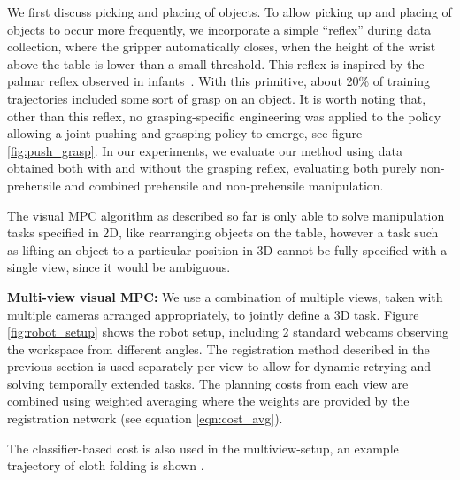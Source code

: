 We first discuss picking and placing of objects. To allow picking up and placing of objects to occur more frequently, we incorporate a simple ``reflex'' during data collection, where the gripper automatically closes, when the height of the wrist above the table is lower than a small threshold. This reflex is inspired by the palmar reflex observed in infants~\cite{grasping_fetal}. With this primitive, about 20\% of training trajectories included some sort of grasp on an object. It is worth noting that, other than this reflex, no grasping-specific engineering was applied to the policy allowing a joint pushing and grasping policy to emerge, see figure \ref{fig:push_grasp}. In our experiments, we evaluate our method using data obtained both with and without the grasping reflex, evaluating both purely non-prehensile and combined prehensile and non-prehensile manipulation.



The visual MPC algorithm as described so far is only able to solve manipulation tasks specified in 2D, like rearranging objects on the table, however a task such as lifting an object to a particular position in 3D cannot be fully specified with a single view, since it would be ambiguous. 

\textbf{Multi-view visual MPC:} We use a combination of multiple views, taken with multiple cameras arranged appropriately, to jointly define a 3D task. Figure \ref{fig:robot_setup} shows the robot setup, including 2 standard webcams observing the workspace from different angles. The registration method described in the previous section is used separately per view to allow for dynamic retrying and solving temporally extended tasks. The planning costs from each view are combined using weighted averaging where the weights are provided by the registration network (see equation \ref{eqn:cost_avg}).  

The classifier-based cost is also used in the multiview-setup, an example trajectory of cloth folding is shown . 




